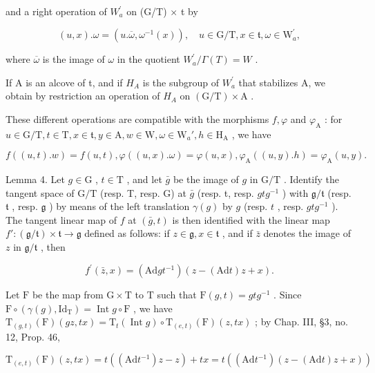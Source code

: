 and a right operation of \(W_{a}^{\prime}\) on (G/T) × t by

\[
(u, x). \omega = (u. \overline {{\omega}}, \omega^ {- 1} (x)), \quad u \in \mathrm{G/T}, x \in \mathfrak {t}, \omega \in \mathrm{W} _ {a} ^ {\prime},
\]

where \(\overline{\omega}\) is the image of \(\omega\) in the quotient \(W_{a}^{\prime}/\Gamma(T)=W\) .

If A is an alcove of t, and if \(H_{A}\) is the subgroup of \(W_{a}^{\prime}\) that stabilizes A, we obtain by restriction an operation of \(H_{A}\) on \((\mathrm{G}/\mathrm{T}) \times \mathrm{A}\) .

These different operations are compatible with the morphisms \(f, \varphi\) and \(\varphi_{\mathrm{A}}\) : for \(u \in \mathrm{G} / \mathrm{T}, t \in \mathrm{T}, x \in \mathfrak{t}, y \in \mathrm{A}, w \in \mathrm{W}, \omega \in \mathrm{W}_a', h \in \mathrm{H}_{\mathrm{A}}\) , we have

\[
f ((u, t). w) = f (u, t), \varphi ((u, x). \omega) = \varphi (u, x), \varphi_ {\mathrm{A}} ((u, y). h) = \varphi_ {\mathrm{A}} (u, y).
\]

Lemma 4. Let \(g \in \mathrm{G}\) , \(t \in \mathrm{T}\) , and let \(\bar{g}\) be the image of \(g\) in \(\mathrm{G} / \mathrm{T}\) . Identify the tangent space of \(\mathrm{G} / \mathrm{T}\) (resp. T, resp. G) at \(\bar{g}\) (resp. t, resp. \(gtg^{-1}\) ) with \(\mathfrak{g} / \mathfrak{t}\) (resp. \(\mathfrak{t}\) , resp. \(\mathfrak{g}\) ) by means of the left translation \(\gamma(g)\) by \(g\) (resp. \(t\) , resp. \(gtg^{-1}\) ). The tangent linear map of \(f\) at \((\bar{g}, t)\) is then identified with the linear map \(f': (\mathfrak{g} / \mathfrak{t}) \times \mathfrak{t} \to \mathfrak{g}\) defined as follows: if \(z \in \mathfrak{g}, x \in \mathfrak{t}\) , and if \(\bar{z}\) denotes the image of \(z\) in \(\mathfrak{g} / \mathfrak{t}\) , then

\[
f ^ {\prime} (\bar {z}, x) = (\mathrm{Ad} g t ^ {- 1}) (z - (\mathrm{Ad} t) z + x).
\]

Let \(\mathrm{F}\) be the map from \(\mathrm{G} \times \mathrm{T}\) to \(\mathrm{T}\) such that \(\mathrm{F}(g,t) = gtg^{-1}\) . Since \(\mathrm{F} \circ (\gamma(g), \mathrm{Id}_{\mathrm{T}}) = \operatorname{Int} g \circ \mathrm{F}\) , we have \(\mathrm{T}_{(g,t)}(\mathrm{F})(gz, tx) = \mathrm{T}_t(\operatorname{Int} g) \circ \mathrm{T}_{(e,t)}(\mathrm{F})(z, tx)\) ; by Chap. III, §3, no. 12, Prop. 46,

\[
\mathrm{T} _ {(e, t)} (\mathrm{F}) (z, t x) = t ((\mathrm{Ad} t ^ {- 1}) z - z) + t x = t ((\mathrm{Ad} t ^ {- 1}) (z - (\mathrm{Ad} t) z + x))
\]

